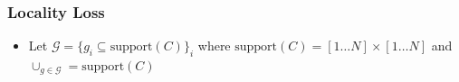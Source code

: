 \begin{frame}
	\frametitle{Locality Loss}
	\begin{itemize}
		\item Let $\mathcal{G} = \{g_i
			\subseteq \textrm{support}(C)\}_i$ where $\textrm{support}(C) = [1 \dots N] \times [1
			\dots N]$ and $\cup_{g \in \mathcal{G}} = \textrm{support}(C)$
			\vspace{-5pt}
		\begin{figure}
			~~~~
			~~~~

\end{figure}
\end{itemize}
\end{frame}
